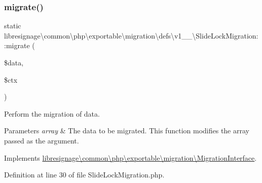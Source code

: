 \subsubsection{\texorpdfstring{migrate()}{migrate()}}
{\footnotesize\ttfamily static libresignage\textbackslash{}common\textbackslash{}php\textbackslash{}exportable\textbackslash{}migration\textbackslash{}defs\textbackslash{}v1\+\_\+\_\textbackslash{}\+Slide\+Lock\+Migration\+::migrate (\begin{DoxyParamCaption}\item[{array \&}]{\$data,  }\item[{\hyperlink{classlibresignage_1_1common_1_1php_1_1exportable_1_1ExportableDataContext}{Exportable\+Data\+Context}}]{\$ctx }\end{DoxyParamCaption})\hspace{0.3cm}{\ttfamily [static]}}

Perform the migration of data.


\begin{DoxyParams}{Parameters}
{\em array} & The data to be migrated. This function modifies the array passed as the argument. \\
\hline
\end{DoxyParams}


Implements \hyperlink{interfacelibresignage_1_1common_1_1php_1_1exportable_1_1migration_1_1MigrationInterface_a8275bfe14f59f19bb3b33b239fd48c5d}{libresignage\textbackslash{}common\textbackslash{}php\textbackslash{}exportable\textbackslash{}migration\textbackslash{}\+Migration\+Interface}.



Definition at line 30 of file Slide\+Lock\+Migration.\+php.

\mbox{\label{classlibresignage_1_1common_1_1php_1_1exportable_1_1migration_1_1defs_1_1v1__1__0_1_1SlideLockMigration_a906bf6a8bb8b01f617fd8a06ff8b79f2}} 
